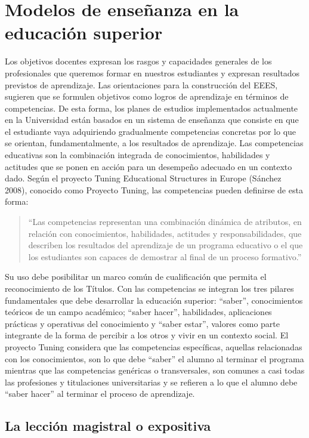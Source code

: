 \documentclass[
  11pt,
  a4paper,
  twoside]{scrreprt}
\begin{document}
\section{Modelos de enseñanza en la educación superior}\label{sec-ens}

Los objetivos docentes expresan los rasgos y capacidades generales de
los profesionales que queremos formar en nuestros estudiantes y expresan
resultados previstos de aprendizaje. Las orientaciones para la
construcción del EEES, sugieren que se formulen objetivos como logros de
aprendizaje en términos de competencias. De esta forma, los planes de
estudios implementados actualmente en la Universidad están basados en un
sistema de enseñanza que consiste en que el estudiante vaya adquiriendo
gradualmente competencias concretas por lo que se orientan,
fundamentalmente, a los resultados de aprendizaje. Las competencias
educativas son la combinación integrada de conocimientos, habilidades y
actitudes que se ponen en acción para un desempeño adecuado en un
contexto dado. Según el proyecto Tuning Educational Structures in Europe
(Sánchez 2008), conocido como Proyecto Tuning, las competencias pueden
definirse de esta forma:

\begin{quote}
``Las competencias representan una combinación dinámica de atributos, en
relación con conocimientos, habilidades, actitudes y responsabilidades,
que describen los resultados del aprendizaje de un programa educativo o
el que los estudiantes son capaces de demostrar al final de un proceso
formativo.''
\end{quote}

Su uso debe posibilitar un marco común de cualificación que permita el
reconocimiento de los Títulos. Con las competencias se integran los tres
pilares fundamentales que debe desarrollar la educación superior:
``saber'', conocimientos teóricos de un campo académico; ``saber
hacer'', habilidades, aplicaciones prácticas y operativas del
conocimiento y ``saber estar'', valores como parte integrante de la
forma de percibir a los otros y vivir en un contexto social. El proyecto
Tuning considera que las competencias específicas, aquellas relacionadas
con los conocimientos, son lo que debe ``saber'' el alumno al terminar
el programa mientras que las competencias genéricas o transversales, son
comunes a casi todas las profesiones y titulaciones universitarias y se
refieren a lo que el alumno debe ``saber hacer'' al terminar el proceso
de aprendizaje.

\subsection{La lección magistral o
expositiva}\label{la-lecciuxf3n-magistral-o-expositiva}
\end{document}
